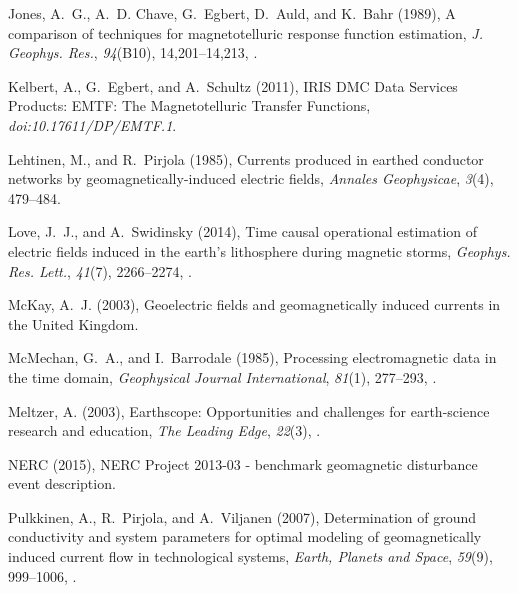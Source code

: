 \documentclass[linenumbers,draft]{agujournal}
\begin{document}
\begin{thebibliography}{28}
Jones, A.~G., A.~D. Chave, G.~Egbert, D.~Auld, and K.~Bahr (1989), A comparison
  of techniques for magnetotelluric response function estimation, \textit{J.
  Geophys. Res.}, \textit{94}(B10), 14,201--14,213,
  .

Kelbert, A., G.~Egbert, and A.~Schultz (2011), {IRIS DMC Data Services
  Products: EMTF: The Magnetotelluric Transfer Functions},
  \textit{doi:10.17611/DP/EMTF.1}.

Lehtinen, M., and R.~Pirjola ({1985}), Currents produced in earthed conductor
  networks by geomagnetically-induced electric fields, \textit{{Annales
  Geophysicae}}, \textit{{3}}({4}), {479--484}.

Love, J.~J., and A.~Swidinsky (2014), Time causal operational estimation of
  electric fields induced in the earth's lithosphere during magnetic storms,
  \textit{Geophys. Res. Lett.}, \textit{41}(7), 2266--2274,
  .

McKay, A.~J. (2003), Geoelectric fields and geomagnetically induced currents in
  the {U}nited {K}ingdom.

McMechan, G.~A., and I.~Barrodale (1985), Processing electromagnetic data in
  the time domain, \textit{Geophysical Journal International}, \textit{81}(1),
  277--293, .

Meltzer, A. (2003), Earthscope: Opportunities and challenges for earth-science
  research and education, \textit{The Leading Edge}, \textit{22}(3),
  .

NERC (2015), {NERC} {P}roject 2013-03 - benchmark geomagnetic disturbance event
  description.

Pulkkinen, A., R.~Pirjola, and A.~Viljanen (2007), Determination of ground
  conductivity and system parameters for optimal modeling of geomagnetically
  induced current flow in technological systems, \textit{Earth, Planets and
  Space}, \textit{59}(9), 999--1006, .


\end{thebibliography}
\end{document}
